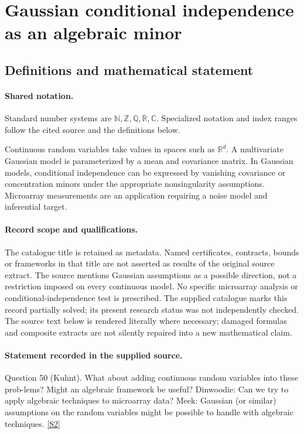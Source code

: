 \documentclass[11pt]{article}
\newcommand{\sref}[2]{\hyperlink{source:#1:#2}{[S#2]}}
\begin{document}
\section{Gaussian conditional independence as an algebraic minor}\label{statement}

\subsection{Definitions and mathematical statement}

\paragraph{Shared notation.}Standard number systems are $\mathbb N,\mathbb Z,\mathbb Q,\mathbb R,\mathbb C$. Specialized notation and index ranges follow the cited source and the definitions below.


Continuous random variables take values in spaces such as $\mathbb R^d$. A multivariate Gaussian model is parameterized by a mean and covariance matrix. In Gaussian models, conditional independence can be expressed by vanishing covariance or concentration minors under the appropriate nonsingularity assumptions. Microarray measurements are an application requiring a noise model and inferential target.
\paragraph{Record scope and qualifications.}
The catalogue title is retained as metadata. Named certificates, contracts, bounds or frameworks in that title are not asserted as results of the original source extract.
The source mentions Gaussian assumptions as a possible direction, not a restriction imposed on every continuous model. No specific microarray analysis or conditional-independence test is prescribed. The supplied catalogue marks this record partially solved; its present research status was not independently checked.
The source text below is rendered literally where necessary; damaged formulas and composite extracts are not silently repaired into a new mathematical claim.
\paragraph{Statement recorded in the supplied source.}
Question 50 (Kuhnt). What about adding continuous random variables into these prob-lems? Might an algebraic framework be useful? Dinwoodie: Can we try to apply algebraic techniques to microarray data? Meek: Gaussian (or similar) assumptions on the random variables might be possible to handle with algebraic techniques. \sref{statement}{2}
\end{document}
